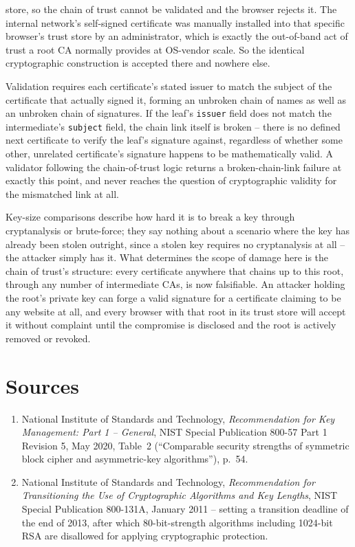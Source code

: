 \begin{answerkey}
store, so the chain of trust cannot be validated and the browser rejects it. The internal network's
self-signed certificate was manually installed into that specific browser's trust store by an
administrator, which is exactly the out-of-band act of trust a root CA normally provides at
OS-vendor scale. So the identical cryptographic construction is accepted there and nowhere else.
\item Validation requires each certificate's stated issuer to match the subject of the certificate
that actually signed it, forming an unbroken chain of names as well as an unbroken chain of
signatures. If the leaf's \texttt{issuer} field does not match the intermediate's \texttt{subject}
field, the chain link itself is broken -- there is no defined next certificate to verify the leaf's
signature against, regardless of whether some other, unrelated certificate's signature happens to
be mathematically valid. A validator following the chain-of-trust logic returns a broken-chain-link
failure at exactly this point, and never reaches the question of cryptographic validity for the
mismatched link at all.
\item Key-size comparisons describe how hard it is to break a key through cryptanalysis or
brute-force; they say nothing about a scenario where the key has already been stolen outright, since
a stolen key requires no cryptanalysis at all -- the attacker simply has it. What determines the
scope of damage here is the chain of trust's structure: every certificate anywhere that chains up to
this root, through any number of intermediate CAs, is now falsifiable. An attacker holding
the root's private key can forge a valid signature for a certificate claiming to be any website at
all, and every browser with that root in its trust store will accept it without complaint until the
compromise is disclosed and the root is actively removed or revoked.
\end{answerkey}

\section*{Sources}
\begin{enumerate}[label=\lbrack\arabic*\rbrack, leftmargin=2.2em]
\item {}National Institute of Standards and Technology, \emph{Recommendation for Key
Management: Part 1 -- General}, NIST Special Publication 800-57 Part 1 Revision 5, May 2020, Table~2
(``Comparable security strengths of symmetric block cipher and asymmetric-key algorithms''), p.~54.
\item {}National Institute of Standards and Technology, \emph{Recommendation for
Transitioning the Use of Cryptographic Algorithms and Key Lengths}, NIST Special Publication 800-131A,
January 2011 -- setting a transition deadline of the end of 2013, after which 80-bit-strength
algorithms including 1024-bit RSA are disallowed for applying cryptographic protection.
\end{enumerate}
